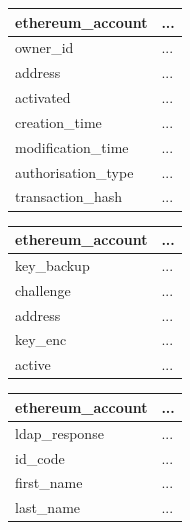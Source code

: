 \documentclass[a4paper,12pt]{article} %
\begin{document}
{\begin{center}
\begin{tabular}{ | l | p{10cm} | }
 \hline
 \textbf{ethereum\_account} & ...
 \\ \hline\hline
 owner\_id & ...
 \\ \hline
 address & ...
 \\ \hline
 activated & ...
 \\ \hline
 creation\_time & ...
 \\ \hline
 modification\_time & ...
 \\ \hline
 authorisation\_type & ...
 \\ \hline
 transaction\_hash & ...
 \\ \hline
\end{tabular}
\end{center}
\label{tab:idDatabaseEthereumAddress}

\begin{center}
\begin{tabular}{ | l | p{10cm} | }
 \hline
 \textbf{ethereum\_account} & ...
 \\ \hline\hline
 key\_backup & ...
 \\ \hline
 challenge & ...
 \\ \hline
 address & ...
 \\ \hline
 key\_enc & ...
 \\ \hline
 active & ...
 \\ \hline
\end{tabular}
\end{center}
\label{tab:idDatabaseKeyBackup}

\begin{center}
\begin{tabular}{ | l | p{10cm} | }
 \hline
 \textbf{ethereum\_account} & ...
 \\ \hline\hline
 ldap\_response & ...
 \\ \hline
 id\_code & ...
 \\ \hline
 first\_name & ...
 \\ \hline
 last\_name & ...
 \\ \hline
\end{tabular}
\end{center}
\label{tab:idDatabaseLdapResponse}

}
\end{document}
